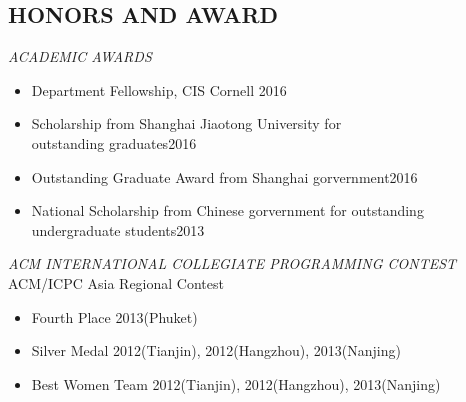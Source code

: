 \documentclass[margin, 10pt]{res} %
\begin{document}
\begin{resume}
\section{HONORS AND AWARD}

{\sl ACADEMIC AWARDS}\\
\begin{itemize}
\item Department Fellowship, CIS Cornell \hfill 2016
\item Scholarship from Shanghai Jiaotong University for\\ outstanding graduates\hfill 2016
\item Outstanding Graduate Award from Shanghai gorvernment\hfill 2016\\
\item National Scholarship from Chinese gorvernment for outstanding\\ undergraduate students\hfill 2013 \\ 
\end{itemize}



{\sl ACM INTERNATIONAL COLLEGIATE PROGRAMMING CONTEST} \\
ACM/ICPC Asia Regional Contest 

\begin{itemize} \itemsep -2pt %
\item Fourth Place \hfill 2013(Phuket)
\item Silver Medal \hfill 2012(Tianjin), 2012(Hangzhou), 2013(Nanjing) 
\item Best Women Team \hfill 2012(Tianjin), 2012(Hangzhou), 2013(Nanjing) 
\end{itemize}
 
\end{resume}
\end{document}
